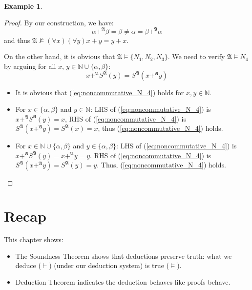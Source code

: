 \documentclass[11pt,letterpaper]{book}
\theoremstyle{definition}
\newtheorem{example}{Example}[section]
\begin{document}
\begin{example}
\begin{proof}
By our construction, we have:
\begin{equation}
\alpha +^{\mathfrak{A}} \beta = \beta \neq \alpha = \beta +^{\mathfrak{A}} \alpha \nonumber
\end{equation}
and thus $\mathfrak{A} \not \models (\forall x )(\forall y) x + y = y + x$.

On the other hand, it is obvious that $\mathfrak{A} \models \{N_1, N_2, N_3 \}$. We need to verify $\mathfrak{A} \models N_4$ by arguing for all $x,\, y \in \mathbb{N} \cup \{ \alpha, \beta \}$:
\begin{equation}
x +^{\mathfrak{A}} S^{\mathfrak{A}}(y) = S^{\mathfrak{A}} ( x +^{\mathfrak{A}} y  )  \label{eq:noncommutative_N_4} \tag{*}
\end{equation}
\begin{itemize}
\item{It is obvious that (\ref{eq:noncommutative_N_4}) holds for $x, y \in \mathbb{N}$.}
\item{For $x \in \{\alpha, \beta \}$ and $y \in \mathbb{N}$: LHS of (\ref{eq:noncommutative_N_4}) is $x +^{\mathfrak{A}} S^{\mathfrak{A}}(y) = x$, RHS of (\ref{eq:noncommutative_N_4}) is $ S^{\mathfrak{A}} ( x +^{\mathfrak{A}} y  ) = S^{\mathfrak{A}} (x) = x $, thus (\ref{eq:noncommutative_N_4}) holds.}
\item{For $x \in \mathbb{N} \cup \{\alpha, \beta \}$ and $y \in \{ \alpha, \beta \}$: LHS of (\ref{eq:noncommutative_N_4}) is $x +^{\mathfrak{A}} S^{\mathfrak{A}}(y) = x +^{\mathfrak{A}} y = y $. RHS of (\ref{eq:noncommutative_N_4}) is $ S^{\mathfrak{A}} ( x +^{\mathfrak{A}} y  ) = S^{\mathfrak{A}} ( y ) = y $. Thus, (\ref{eq:noncommutative_N_4}) holds.}

\end{itemize}

\end{proof}

\end{example}


\section{Recap}



This chapter shows:
\begin{itemize}
\item{The Soundness Theorem shows that deductions preserve truth: what 
we deduce ($\vdash$) (under our deduction system) is true ($\models$). }
\item{Deduction Theorem indicates the deduction behaves like proofs behave.}
\end{itemize}
\end{document}

